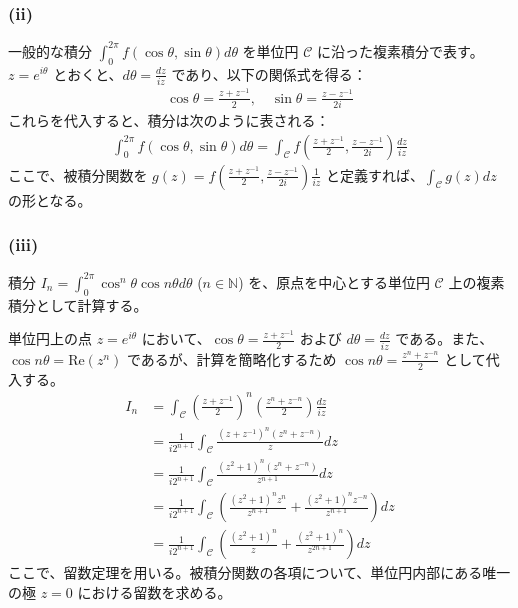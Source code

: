 \documentclass[platex,dvipdfmx,a4paper]{jsarticle}
\begin{document}
  \subsubsection*{(ii)}
  一般的な積分 $\int_{0}^{2\pi} f(\cos \theta, \sin \theta) d\theta$ を単位円 $\mathcal{C}$ に沿った複素積分で表す。
  $z = e^{i\theta}$ とおくと、$d\theta = \frac{dz}{iz}$ であり、以下の関係式を得る：
  \begin{align*}
  \cos \theta = \frac{z + z^{-1}}{2}, \quad \sin \theta = \frac{z - z^{-1}}{2i}
  \end{align*}
  これらを代入すると、積分は次のように表される：
  \begin{align*}
  \int_{0}^{2\pi} f(\cos \theta, \sin \theta) d\theta = \int_{\mathcal{C}} f\left( \frac{z + z^{-1}}{2}, \frac{z - z^{-1}}{2i} \right) \frac{dz}{iz}
  \end{align*}
  ここで、被積分関数を $g(z) = f\left( \frac{z + z^{-1}}{2}, \frac{z - z^{-1}}{2i} \right) \frac{1}{iz}$ と定義すれば、$\int_{\mathcal{C}} g(z) dz$ の形となる。

  \subsubsection*{(iii)}
  積分 $I_n = \int_{0}^{2\pi} \cos^n \theta \cos n\theta d\theta$ ($n \in \mathbb{N}$) を、原点を中心とする単位円 $\mathcal{C}$ 上の複素積分として計算する。

  単位円上の点 $z = e^{i\theta}$ において、$\cos \theta = \frac{z + z^{-1}}{2}$ および $d\theta = \frac{dz}{iz}$ である。また、$\cos n\theta = \text{Re}(z^n)$ であるが、計算を簡略化するため $\cos n\theta = \frac{z^n + z^{-n}}{2}$ として代入する。
  \begin{align*}
  I_n &= \int_{\mathcal{C}} \left( \frac{z + z^{-1}}{2} \right)^n \left( \frac{z^n + z^{-n}}{2} \right) \frac{dz}{iz} \\
  &= \frac{1}{i 2^{n+1}} \int_{\mathcal{C}} \frac{(z + z^{-1})^n (z^n + z^{-n})}{z} dz \\
  &= \frac{1}{i 2^{n+1}} \int_{\mathcal{C}} \frac{(z^2 + 1)^n (z^n + z^{-n})}{z^{n+1}} dz \\
  &= \frac{1}{i 2^{n+1}} \int_{\mathcal{C}} \left( \frac{(z^2 + 1)^n z^n}{z^{n+1}} + \frac{(z^2 + 1)^n z^{-n}}{z^{n+1}} \right) dz \\
  &= \frac{1}{i 2^{n+1}} \int_{\mathcal{C}} \left( \frac{(z^2 + 1)^n}{z} + \frac{(z^2 + 1)^n}{z^{2n+1}} \right) dz
  \end{align*}
  ここで、留数定理を用いる。被積分関数の各項について、単位円内部にある唯一の極 $z=0$ における留数を求める。
\end{document}
